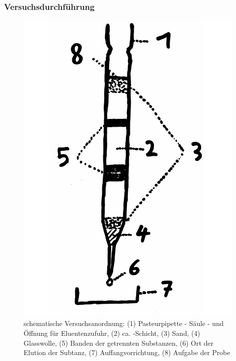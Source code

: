 \documentclass{article}
\begin{document}
      \subsubsection{Versuchsdurchführung} \label{sec:Versuchsdurchzwei}
        
        \begin{figure}[H]
          \includegraphics[scale=0.08, center]{Graphiken/Versuchsanordnungen/VersuchsanordnungSC.png} 
          \caption[schematische Versuchsanordnung Säulenchromatographie, Quelle: Autor]{schematische Versuchsanordnung: (1) Pasteurpipette - Säule - und Öffnung für Eluentenzufuhr, (2) ca. -Schicht, (3) Sand, (4) Glasswolle, (5) Banden der getrennten Substanzen, (6) Ort der Elution der Subtanz, (7) Auffangvorrichtung, (8) Aufgabe der Probe}
          \label{fig:Versuchsanordnungzwei}
        \end{figure}
        
\end{document}
